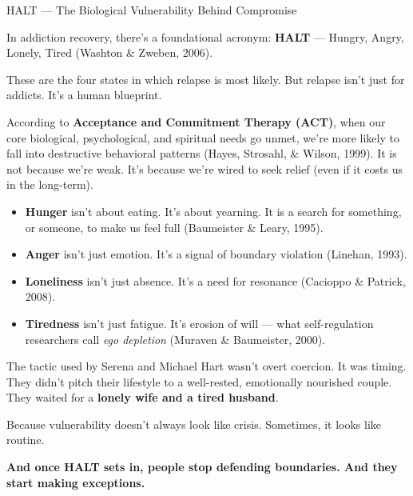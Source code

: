 \begin{PsychologicalSidebar}{HALT — The Biological Vulnerability Behind Compromise}

  In addiction recovery, there’s a foundational acronym: \textbf{HALT} — Hungry, Angry, Lonely, Tired 
  (Washton \& Zweben, 2006).

  \medskip
  
  These are the four states in which relapse is most likely.  
  But relapse isn’t just for addicts. It’s a human blueprint.

  \medskip

  According to \textbf{Acceptance and Commitment Therapy (ACT)}, when our core biological, psychological, 
  and spiritual needs go unmet, we’re more likely to fall into destructive behavioral patterns 
  (Hayes, Strosahl, \& Wilson, 1999).  
  It is not because we’re weak. 
  It’s because we’re wired to seek relief (even if it costs us in the long-term).

  \medskip
 
  \begin{itemize}
    \item \textbf{Hunger} isn’t about eating. It’s about yearning.  
    It is a search for something, or someone, to make us feel full (Baumeister \& Leary, 1995).

    \item \textbf{Anger} isn’t just emotion. It’s a signal of boundary violation (Linehan, 1993).

    \item \textbf{Loneliness} isn’t just absence. It’s a need for resonance (Cacioppo \& Patrick, 2008).

    \item \textbf{Tiredness} isn’t just fatigue. It’s erosion of will  
    — what self-regulation researchers call \textit{ego depletion} (Muraven \& Baumeister, 2000).
  \end{itemize}
  
  \medskip
  
  The tactic used by Serena and Michael Hart wasn’t overt coercion. It was timing.  
  They didn’t pitch their lifestyle to a well-rested, emotionally nourished couple.  
  They waited for a \textbf{lonely wife and a tired husband}.

  \medskip
  
  Because vulnerability doesn’t always look like crisis.  
  Sometimes, it looks like routine.

  \medskip
  
  \textbf{And once HALT sets in, people stop defending boundaries. And they start making exceptions.}

\end{PsychologicalSidebar}

